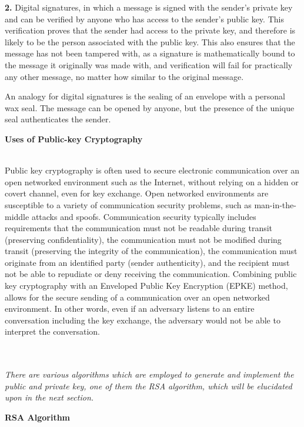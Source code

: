 \documentclass[12 pt]{article}
\begin{document}
\textbf{2. }Digital signatures, in which a message is signed with the sender's private key and can be verified by anyone who has access to the sender's public key. This verification proves that the sender had access to the private key, and therefore is likely to be the person associated with the public key. This also ensures that the message has not been tampered with, as a signature is mathematically bound to the message it originally was made with, and verification will fail for practically any other message, no matter how similar to the original message.

An analogy for digital signatures is the sealing of an envelope with a personal wax seal. The message can be opened by anyone, but the presence of the unique seal authenticates the sender.

\pagebreak

\begin{Large}
\noindent \textbf{{Uses of Public-key Cryptography}}
\end{Large}
\\Public key cryptography is often used to secure electronic communication over an open networked environment such as the Internet, without relying on a hidden or covert channel, even for key exchange. Open networked environments are susceptible to a variety of communication security problems, such as man-in-the-middle attacks and spoofs. Communication security typically includes requirements that the communication must not be readable during transit (preserving confidentiality), the communication must not be modified during transit (preserving the integrity of the communication), the communication must originate from an identified party (sender authenticity), and the recipient must not be able to repudiate or deny receiving the communication. Combining public key cryptography with an Enveloped Public Key Encryption (EPKE) method, allows for the secure sending of a communication over an open networked environment. In other words, even if an adversary listens to an entire conversation including the key exchange, the adversary would not be able to interpret the conversation.

\emph{\\\\There are various algorithms which are employed to generate and implement the public and private key, one of them the RSA algorithm, which will be elucidated upon in the next section.}

\pagebreak

\begin{LARGE}
\begin{center}
  \textbf{{RSA Algorithm}}
\end{center}
\end{LARGE}\bigskip
\end{document}
